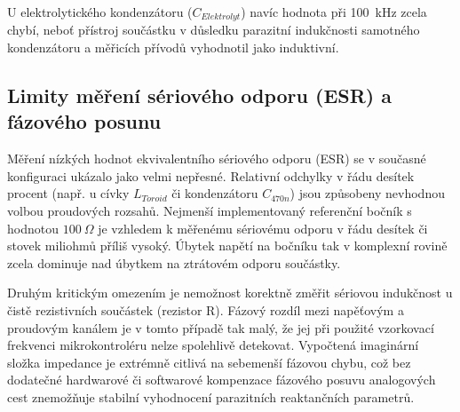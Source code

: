 U elektrolytického kondenzátoru ($C_{Elektrolyt}$) navíc hodnota při 100~kHz zcela chybí, neboť přístroj součástku v důsledku parazitní indukčnosti samotného kondenzátoru a měřicích přívodů vyhodnotil jako induktivní.

\subsection{Limity měření sériového odporu (ESR) a fázového posunu}
Měření nízkých hodnot ekvivalentního sériového odporu (ESR) se v současné konfiguraci ukázalo jako velmi nepřesné. Relativní odchylky v řádu desítek procent (např. u cívky $L_{Toroid}$ či kondenzátoru $C_{470n}$) jsou způsobeny nevhodnou volbou proudových rozsahů. Nejmenší implementovaný referenční bočník s hodnotou $100~\Omega$ je vzhledem k měřenému sériovému odporu v řádu desítek či stovek miliohmů příliš vysoký. Úbytek napětí na bočníku tak v komplexní rovině zcela dominuje nad úbytkem na ztrátovém odporu součástky.

Druhým kritickým omezením je nemožnost korektně změřit sériovou indukčnost u čistě rezistivních součástek (rezistor R). Fázový rozdíl mezi napěťovým a proudovým kanálem je v tomto případě tak malý, že jej při použité vzorkovací frekvenci mikrokontroléru nelze spolehlivě detekovat. Vypočtená imaginární složka impedance je extrémně citlivá na sebemenší fázovou chybu, což bez dodatečné hardwarové či softwarové kompenzace fázového posuvu analogových cest znemožňuje stabilní vyhodnocení parazitních reaktančních parametrů.



 